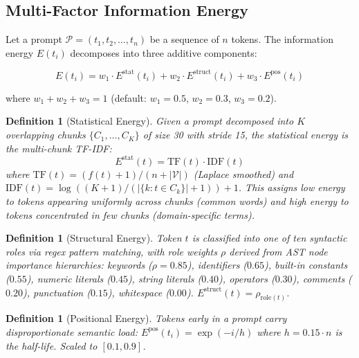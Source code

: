 \documentclass[11pt]{article}
\newtheorem{definition}[theorem]{Definition}
\theoremstyle{remark}
\newcommand{\Es}{E^{\text{stat}}}
\newcommand{\Er}{E^{\text{struct}}}
\newcommand{\Ep}{E^{\text{pos}}}
\begin{document}
\subsection{Multi-Factor Information Energy}
\label{sec:energy}

Let a prompt $\mathcal{P} = (t_1, t_2, \ldots, t_n)$ be a sequence of $n$
tokens. The information energy $E(t_i)$ decomposes into three additive
components:

\begin{equation}
    E(t_i) = w_1 \cdot \Es(t_i) + w_2 \cdot \Er(t_i) + w_3 \cdot \Ep(t_i)
    \label{eq:multi-factor}
\end{equation}

where $w_1 + w_2 + w_3 = 1$ (default: $w_1 = 0.5$, $w_2 = 0.3$, $w_3 = 0.2$).

\begin{definition}[Statistical Energy]
\label{def:stat-energy}
Given a prompt decomposed into $K$ overlapping chunks $\{C_1, \ldots, C_K\}$
of size 30 with stride 15, the statistical energy is the multi-chunk TF-IDF:
\begin{equation}
    \Es(t) = \text{TF}(t) \cdot \text{IDF}(t)
\end{equation}
where $\text{TF}(t) = (f(t) + 1)/(n + |\mathcal{V}|)$ (Laplace smoothed) and
$\text{IDF}(t) = \log((K+1)/(|\{k : t \in C_k\}| + 1)) + 1$. This assigns
low energy to tokens appearing uniformly across chunks (common words) and
high energy to tokens concentrated in few chunks (domain-specific terms).
\end{definition}

\begin{definition}[Structural Energy]
\label{def:struct-energy}
Token $t$ is classified into one of ten syntactic roles via regex pattern
matching, with role weights $\rho$ derived from AST node importance
hierarchies: keywords ($\rho = 0.85$), identifiers ($0.65$), built-in
constants ($0.55$), numeric literals ($0.45$), string literals ($0.40$),
operators ($0.30$), comments ($0.20$), punctuation ($0.15$), whitespace
($0.00$). $\Er(t) = \rho_{\text{role}(t)}$.
\end{definition}

\begin{definition}[Positional Energy]
\label{def:pos-energy}
Tokens early in a prompt carry disproportionate semantic load:
$\Ep(t_i) = \exp(-i / h)$ where $h = 0.15 \cdot n$ is the half-life.
Scaled to $[0.1, 0.9]$.
\end{definition}
\end{document}
